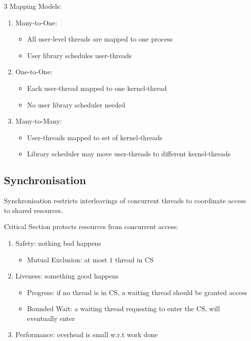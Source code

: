 \documentclass[12pt, a4paper]{article}
\begin{document}
\begin{multicols*}{3}
Mapping Models:
\begin{enumerate}[\roman*.]
  \item Many-to-One:
    \begin{itemize}[leftmargin=*]\vspace{2pt}
      \item All user-level threads are mapped to one process
      \item User library schedules user-threads
    \end{itemize}
  \item One-to-One:
    \begin{itemize}[leftmargin=*]\vspace{2pt}
      \item Each user-thread mapped to one kernel-thread
      \item No user library scheduler needed
    \end{itemize}
  \item Many-to-Many:
    \begin{itemize}[leftmargin=*]\vspace{2pt}
      \item User-threads mapped to set of kernel-threads
      \item Library scheduler may move user-threads to different kernel-threads
    \end{itemize}
\end{enumerate}
\vspace{-1em}
\colbreak 
\subsection{Synchronisation}
Synchronisation restricts interleavings of concurrent threads to coordinate access to shared resources.

Critical Section protects resources from concurrent access:
\begin{enumerate}[\roman*.]
  \item Safety: nothing bad happens
    \begin{itemize}[leftmargin=*]\vspace{3pt}
      \item Mutual Exclusion: at most $1$ thread in CS
    \end{itemize}
  \item Liveness: something good happens 
    \begin{itemize}[leftmargin=*]\vspace{3pt}
      \item Progress: if no thread is in CS, a waiting thread should be granted access 
      \item Bounded Wait: a waiting thread requesting to enter the CS, will eventually enter
    \end{itemize}
  \item Performance: overhead is small w.r.t work done
\end{enumerate}


\end{multicols*}
\end{document}
